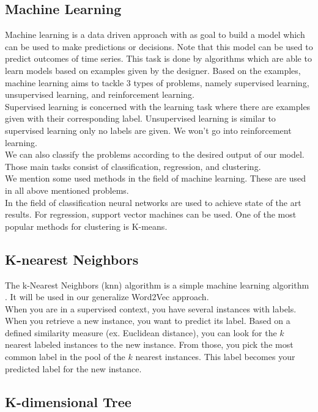 	\subsection{Machine Learning}
Machine learning is a data driven approach with as goal to build a model which can be	used to make predictions or decisions. Note that this model can be used to predict outcomes of time series. This task is done by algorithms which are able to learn models based on examples given by the designer. Based on the examples, machine learning aims to tackle $3$ types of problems, namely supervised learning, unsupervised learning, and reinforcement learning. \\
Supervised learning is concerned with the learning task where there are examples given with their corresponding label. Unsupervised learning is similar to supervised learning only no labels are given. We won't go into reinforcement learning. \\
We can also classify the problems according to the desired output of our model. Those main tasks consist of classification, regression, and clustering. \\
	
We mention some used methods in the field of machine learning. These are used in all above mentioned problems. \\
In the field of classification neural networks are used to achieve state of the art results. For regression, support vector machines can be used. One of the most popular methods for clustering is K-means. 

	\subsection{K-nearest Neighbors}
	\label{sec:knn}
	
The k-Nearest Neighbors (knn) algorithm is a simple machine learning algorithm \cite{knn:article}. It will be used in our generalize Word2Vec approach. \\
When you are in a supervised context, you have several instances with labels. When you retrieve a new instance, you want to predict its label. Based on a defined similarity measure (ex. Euclidean distance), you can look for the $k$ nearest labeled instances to the new instance. From those, you pick the most common label in the pool of the $k$ nearest instances. This label becomes your predicted label for the new instance.
	
	
	\subsection{K-dimensional Tree}
	\label{sec:kdtree}
	
